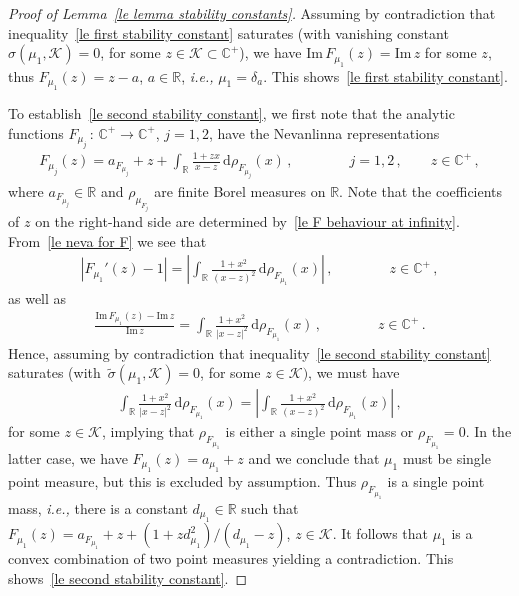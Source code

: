 \documentclass[10pt,reqno]{amsart}
\numberwithin{equation}{section}
\theoremstyle{plain}
\numberwithin{kevin}{section}
\theoremstyle{remark}
\newcommand{\im}{\mathrm{Im}\,}
\newcommand{\R}{{\mathbb R }}
\newcommand{\C}{{\mathbb C}}
\newcommand{\dd}{\mathrm{d}}
\newcommand{\ie}{\emph{i.e., }}
\begin{document}
\begin{proof}[Proof of Lemma~\ref{le lemma stability constants}]
Assuming by contradiction that inequality~\eqref{le first stability constant} saturates (with vanishing constant $\sigma(\mu_1,\mathcal{K})=0$, for some $z\in \mathcal{K}\subset \C^+$), we have $\im F_{\mu_1}(z)=\im z$ for some $z$, thus $F_{\mu_1}(z)=z-a$, $a\in\R$, \ie $\mu_1=\delta_a$. This shows~\eqref{le first stability constant}.

To establish~\eqref{le second stability constant}, we first note that the analytic functions $F_{\mu_j}\,:\,\C^+\rightarrow \C^+$, $j=1,2$, have the Nevanlinna representations
\begin{align}\label{le neva for F}
 F_{\mu_j}(z)=a_{F_{\mu_j}}+z+\int_\R\frac{1+zx}{x-z}\,\dd\rho_{F_{\mu_j}}(x)\,,\qquad\qquad j=1,2\,,\qquad z\in\C^+\,,
\end{align}
where $a_{F_{\mu_j}}\in\R$ and $\rho_{{\mu_{F_j}}}$ are finite Borel measures on $\R$. Note that the coefficients of $z$ on the right-hand side are determined by~\eqref{le F behaviour at infinity}. From~\eqref{le neva for F} we see that
\begin{align}
|F_{\mu_1}'(z)-1|= \left|\int_\R\frac{1+x^2}{(x-z)^2}\,\dd\rho_{F_{\mu_1}}(x) \right|\,,\qquad\qquad z\in \C^+\,,
\end{align}
as well as
\begin{align}
\frac{\im F_{\mu_1}(z)-\im z }{\im z}=\int_\R\frac{1+x^2}{|x-z|^2}\,\dd\rho_{F_{\mu_1}}(x) \,,\qquad\qquad z\in \C^+\,.
\end{align}
Hence, assuming by contradiction that inequality~\eqref{le second stability constant} saturates (with~$\widetilde\sigma(\mu_1,\mathcal{K})=0$, for some $z\in \mathcal{K})$, we must have
\begin{align}
 \int_\R\frac{1+x^2}{|x-z|^2}\,\dd\rho_{F_{\mu_1}}(x) =\left|\int_\R\frac{1+x^2}{(x-z)^2}\,\dd\rho_{F_{\mu_1}}(x) \right|\,,
\end{align}
for some $z\in \mathcal{K}$, implying that $\rho_{F_{\mu_1}}$ is either a single point mass or $\rho_{F_{\mu_1}}=0$. In the latter case, we have $F_{\mu_1}(z)=a_{\mu_1}+z $ and we conclude that $\mu_1$ must be single point measure, but this is excluded by assumption. Thus $\rho_{F_{\mu_1}}$ is a single point mass, \ie there is a constant $d_{\mu_1}\in\R$ such that $F_{\mu_1}(z)=a_{F_{\mu_1}}+z+(1+zd_{\mu_1}^{2})/(d_{\mu_1}-z)$, $z\in \mathcal{K}$. It follows that $\mu_1$ is a convex combination of two point measures yielding a contradiction. This shows~\eqref{le second stability constant}. 
\end{proof}
\end{document}
